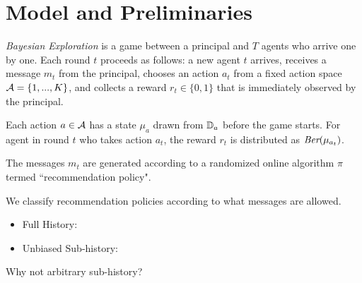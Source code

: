 \section{Model and Preliminaries}
\label{sec:model}

\emph{Bayesian Exploration} is a game between a principal and $T$ agents who arrive one by one. Each round $t$ proceeds as follows: a new agent $t$ arrives, receives a message $m_t$ from the principal, chooses an action $a_t$ from a fixed action space $\mathcal{A} = \{1,...,K\}$, and collects a reward $r_t\in \{0,1\}$ that is immediately observed by the principal. 

Each action $a \in \mathcal{A}$ has a state $\mu_a$ drawn from $\mathbb{D}_a$ before the game starts. For agent in round $t$ who takes action $a_t$, the reward $r_t$ is distributed as $\emph{Ber}(\mu_{a_t})$.  

The messages $m_t$ are generated according to a randomized online algorithm $\pi$ termed ``recommendation policy".

 We classify recommendation policies according to what messages are allowed. 
\begin{itemize}
\item Full History: 
\item Unbiased Sub-history: 
\end{itemize}

\begin{remark}
Why not arbitrary sub-history?
\end{remark}

